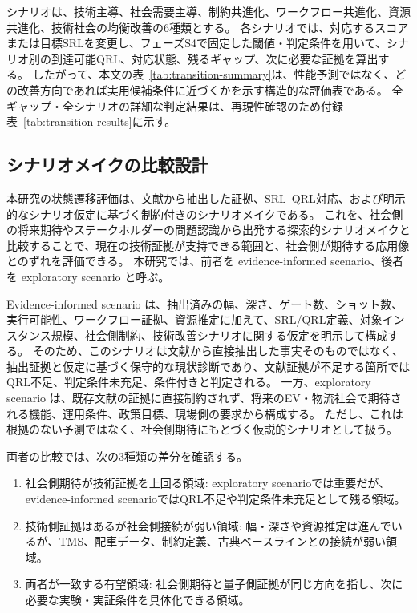 シナリオは、技術主導、社会需要主導、制約共進化、ワークフロー共進化、資源共進化、技術社会の均衡改善の6種類とする。
各シナリオでは、対応するスコアまたは目標SRLを変更し、フェーズS4で固定した閾値・判定条件を用いて、シナリオ別の到達可能QRL、対応状態、残るギャップ、次に必要な証拠を算出する。
したがって、本文の表~\ref{tab:transition-summary}は、性能予測ではなく、どの改善方向であれば実用候補条件に近づくかを示す構造的な評価表である。
全ギャップ・全シナリオの詳細な判定結果は、再現性確認のため付録表~\ref{tab:transition-results}に示す。

\subsection{シナリオメイクの比較設計}

本研究の状態遷移評価は、文献から抽出した証拠、SRL--QRL対応、および明示的なシナリオ仮定に基づく制約付きのシナリオメイクである。
これを、社会側の将来期待やステークホルダーの問題認識から出発する探索的シナリオメイクと比較することで、現在の技術証拠が支持できる範囲と、社会側が期待する応用像とのずれを評価できる。
本研究では、前者を evidence-informed scenario、後者を exploratory scenario と呼ぶ。

Evidence-informed scenario は、抽出済みの幅、深さ、ゲート数、ショット数、実行可能性、ワークフロー証拠、資源推定に加えて、SRL/QRL定義、対象インスタンス規模、社会側制約、技術改善シナリオに関する仮定を明示して構成する。
そのため、このシナリオは文献から直接抽出した事実そのものではなく、抽出証拠と仮定に基づく保守的な現状診断であり、文献証拠が不足する箇所ではQRL不足、判定条件未充足、条件付きと判定される。
一方、exploratory scenario は、既存文献の証拠に直接制約されず、将来のEV・物流社会で期待される機能、運用条件、政策目標、現場側の要求から構成する。
ただし、これは根拠のない予測ではなく、社会側期待にもとづく仮説的シナリオとして扱う。

両者の比較では、次の3種類の差分を確認する。

\begin{enumerate}
  \item 社会側期待が技術証拠を上回る領域: exploratory scenarioでは重要だが、evidence-informed scenarioではQRL不足や判定条件未充足として残る領域。
  \item 技術側証拠はあるが社会側接続が弱い領域: 幅・深さや資源推定は進んでいるが、TMS、配車データ、制約定義、古典ベースラインとの接続が弱い領域。
  \item 両者が一致する有望領域: 社会側期待と量子側証拠が同じ方向を指し、次に必要な実験・実証条件を具体化できる領域。
\end{enumerate}

